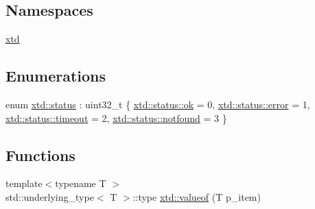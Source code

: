 \subsection*{Namespaces}
\begin{DoxyCompactItemize}
\item 
\hyperlink{namespacextd}{xtd}
\end{DoxyCompactItemize}
\subsection*{Enumerations}
\begin{DoxyCompactItemize}
\item 
enum \hyperlink{namespacextd_a68ed4fe8e9c11116b68efe5b102aec50}{xtd\-::status} \-: uint32\-\_\-t \{ \hyperlink{namespacextd_a68ed4fe8e9c11116b68efe5b102aec50a444bcb3a3fcf8389296c49467f27e1d6}{xtd\-::status\-::ok} = 0, 
\hyperlink{namespacextd_a68ed4fe8e9c11116b68efe5b102aec50acb5e100e5a9a3e7f6d1fd97512215282}{xtd\-::status\-::error} = 1, 
\hyperlink{namespacextd_a68ed4fe8e9c11116b68efe5b102aec50a90272dda245ae1fb3cf197e91a8689dc}{xtd\-::status\-::timeout} = 2, 
\hyperlink{namespacextd_a68ed4fe8e9c11116b68efe5b102aec50ac2adf6ecc220f2711801d6e466340183}{xtd\-::status\-::notfound} = 3
 \}
\end{DoxyCompactItemize}
\subsection*{Functions}
\begin{DoxyCompactItemize}
\item 
{\footnotesize template$<$typename T $>$ }\\std\-::underlying\-\_\-type$<$ T $>$\-::type \hyperlink{namespacextd_a518b0ddcbf87f6c21175d2760f4fbe21}{xtd\-::valueof} (T p\-\_\-item)
\end{DoxyCompactItemize}
